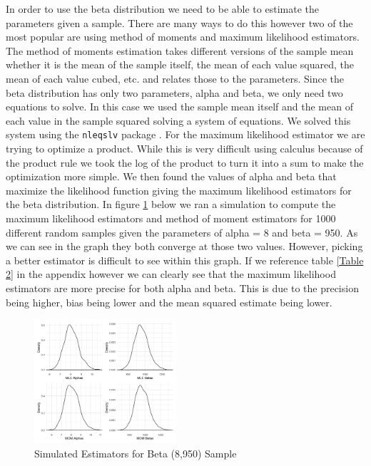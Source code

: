 \documentclass{article}\usepackage[]{graphicx}\usepackage[]{xcolor}
\begin{document}
\begin{multicols}{2}
In order to use the beta distribution we need to be able to estimate the parameters given a sample. There are many ways to do this however two of the most popular are using method of moments and maximum likelihood estimators. The method of moments estimation takes different versions of the sample mean whether it is the mean of the sample itself, the mean of each value squared, the mean of each value cubed, etc. and relates those to the parameters. Since the beta distribution has only two parameters, alpha and beta, we only need two equations to solve. In this case we used the sample mean itself and the mean of each value in the sample squared solving a system of equations. We solved this system using the \texttt{nleqslv} package \citep{nleqslv}. For the maximum likelihood estimator we are trying to optimize a product. While this is very difficult using calculus because of the product rule we took the log of the product to turn it into a sum to make the optimization more simple. We then found the values of alpha and beta that maximize the likelihood function giving the maximum likelihood estimators for the beta distribution. In figure \ref{Figure 7} below we ran a simulation to compute the maximum likelihood estimators and method of moment estimators for 1000 different random samples given the parameters of alpha = 8 and beta = 950. As we can see in the graph they both converge at those two values. However, picking a better estimator is difficult to see within this graph. If we reference table \ref{Table 2} in the appendix however we can clearly see that the maximum likelihood estimators are more precise for both alpha and beta. This is due to the precision being higher, bias being lower and the mean squared estimate being lower. 

\begin{figure}[H]
\centering
\includegraphics[width=0.47\textwidth]{SimuEsti}  %
\caption{Simulated Estimators for Beta (8,950) Sample}
\label{Figure 7}
\end{figure}


\end{multicols}
\end{document}
